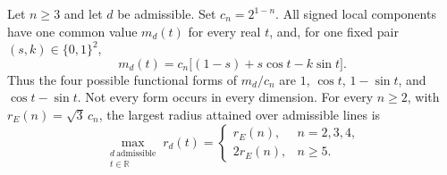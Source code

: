 \begin{theorem}
\label{bound:theorem}
Let $n\ge3$ and let $d$ be admissible.  Set $c_n=2^{1-n}$.
All signed local components have one common value $m_d(t)$ for every
real $t$, and, for one fixed pair $(s,k)\in\{0,1\}^2$,
\begin{equation}
 m_d(t)=c_n\bigl[(1-s)+s\cos t-k\sin t\bigr].
 \label{bound:four-laws}
\end{equation}
Thus the four possible functional forms of $m_d/c_n$ are
$1$, $\cos t$, $1-\sin t$, and $\cos t-\sin t$.
Not every form occurs in every dimension.
For every $n\ge2$, with $r_E(n)=\sqrt3\,c_n$, the largest radius attained over admissible lines is
\begin{equation}
 \max_{\substack{d\ \text{admissible}\\t\in\mathbb R}}r_d(t)
 =\begin{cases}
 r_E(n),&n=2,3,4,\\
 2r_E(n),&n\ge5.
 \end{cases}
 \label{bound:sharp-max}
\end{equation}
\end{theorem}

